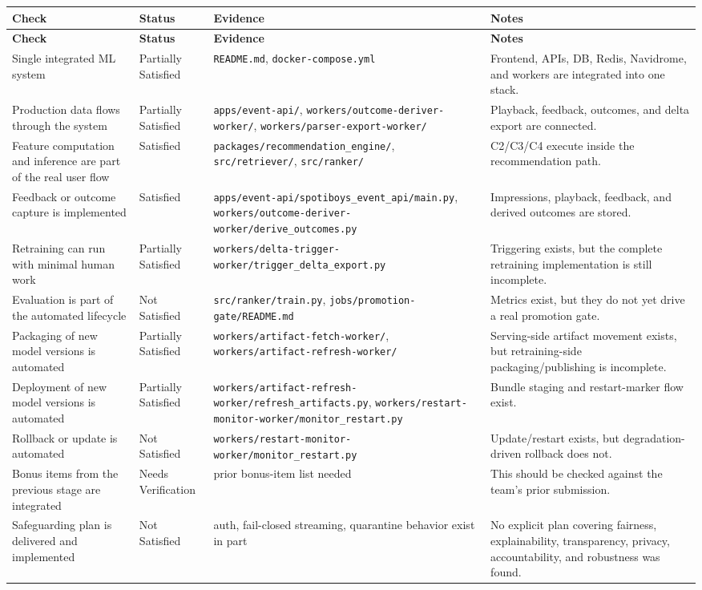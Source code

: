 \documentclass[11pt,a4paper]{article}
\begin{document}
\begin{longtable}{P{4.2cm}P{2.4cm}P{3.8cm}P{4.8cm}}
\toprule
\textbf{Check} & \textbf{Status} & \textbf{Evidence} & \textbf{Notes} \\
\midrule
\endfirsthead
\toprule
\textbf{Check} & \textbf{Status} & \textbf{Evidence} & \textbf{Notes} \\
\midrule
\endhead
Single integrated ML system & Partially Satisfied & \texttt{README.md}, \texttt{docker-compose.yml} & Frontend, APIs, DB, Redis, Navidrome, and workers are integrated into one stack. \\
Production data flows through the system & Partially Satisfied & \texttt{apps/event-api/}, \texttt{workers/outcome-deriver-worker/}, \texttt{workers/parser-export-worker/} & Playback, feedback, outcomes, and delta export are connected. \\
Feature computation and inference are part of the real user flow & Satisfied & \texttt{packages/recommendation\_engine/}, \texttt{src/retriever/}, \texttt{src/ranker/} & C2/C3/C4 execute inside the recommendation path. \\
Feedback or outcome capture is implemented & Satisfied & \texttt{apps/event-api/spotiboys\_event\_api/main.py}, \texttt{workers/outcome-deriver-worker/derive\_outcomes.py} & Impressions, playback, feedback, and derived outcomes are stored. \\
Retraining can run with minimal human work & Partially Satisfied & \texttt{workers/delta-trigger-worker/trigger\_delta\_export.py} & Triggering exists, but the complete retraining implementation is still incomplete. \\
Evaluation is part of the automated lifecycle & Not Satisfied & \texttt{src/ranker/train.py}, \texttt{jobs/promotion-gate/README.md} & Metrics exist, but they do not yet drive a real promotion gate. \\
Packaging of new model versions is automated & Partially Satisfied & \texttt{workers/artifact-fetch-worker/}, \texttt{workers/artifact-refresh-worker/} & Serving-side artifact movement exists, but retraining-side packaging/publishing is incomplete. \\
Deployment of new model versions is automated & Partially Satisfied & \texttt{workers/artifact-refresh-worker/refresh\_artifacts.py}, \texttt{workers/restart-monitor-worker/monitor\_restart.py} & Bundle staging and restart-marker flow exist. \\
Rollback or update is automated & Not Satisfied & \texttt{workers/restart-monitor-worker/monitor\_restart.py} & Update/restart exists, but degradation-driven rollback does not. \\
Bonus items from the previous stage are integrated & Needs Verification & prior bonus-item list needed & This should be checked against the team's prior submission. \\
Safeguarding plan is delivered and implemented & Not Satisfied & auth, fail-closed streaming, quarantine behavior exist in part & No explicit plan covering fairness, explainability, transparency, privacy, accountability, and robustness was found. \\
\bottomrule
\end{longtable}
\end{document}
